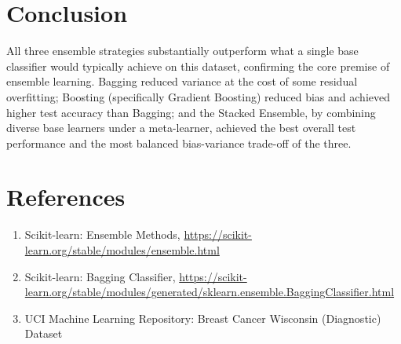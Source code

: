 \documentclass[12pt,a4paper]{article}
\begin{document}
\section{Conclusion}
All three ensemble strategies substantially outperform what a single base
classifier would typically achieve on this dataset, confirming the core premise
of ensemble learning. Bagging reduced variance at the cost of some residual
overfitting; Boosting (specifically Gradient Boosting) reduced bias and achieved
higher test accuracy than Bagging; and the Stacked Ensemble, by combining diverse
base learners under a meta-learner, achieved the best overall test performance
and the most balanced bias-variance trade-off of the three.

\section{References}
\begin{enumerate}
\item Scikit-learn: Ensemble Methods, \url{https://scikit-learn.org/stable/modules/ensemble.html}
\item Scikit-learn: Bagging Classifier, \url{https://scikit-learn.org/stable/modules/generated/sklearn.ensemble.BaggingClassifier.html}
\item UCI Machine Learning Repository: Breast Cancer Wisconsin (Diagnostic) Dataset
\end{enumerate}
\end{document}
